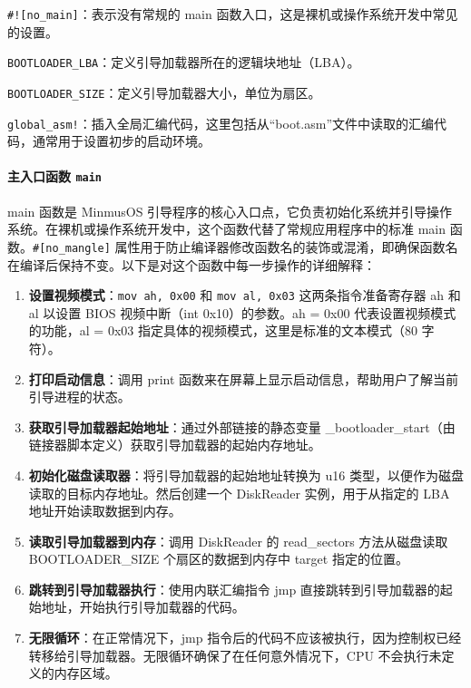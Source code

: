 \texttt{\#![no\_main]}：表示没有常规的 main 函数入口，这是裸机或操作系统开发中常见的设置。

\texttt{BOOTLOADER\_LBA}：定义引导加载器所在的逻辑块地址（LBA）。

\texttt{BOOTLOADER\_SIZE}：定义引导加载器大小，单位为扇区。

\texttt{global\_asm!}：插入全局汇编代码，这里包括从“boot.asm”文件中读取的汇编代码，通常用于设置初步的启动环境。

\paragraph{主入口函数 \texttt{main}}

main 函数是 MinmusOS 引导程序的核心入口点，它负责初始化系统并引导操作系统。在裸机或操作系统开发中，这个函数代替了常规应用程序中的标准 main 函数。\texttt{\#[no\_mangle]} 属性用于防止编译器修改函数名的装饰或混淆，即确保函数名在编译后保持不变。以下是对这个函数中每一步操作的详细解释：

\begin{enumerate}
    \item \textbf{设置视频模式}：\texttt{mov ah, 0x00} 和 \texttt{mov al, 0x03} 这两条指令准备寄存器 ah 和 al 以设置 BIOS 视频中断（int 0x10）的参数。ah = 0x00 代表设置视频模式的功能，al = 0x03 指定具体的视频模式，这里是标准的文本模式（80  字符）。
    \item \textbf{打印启动信息}：调用 print 函数来在屏幕上显示启动信息，帮助用户了解当前引导进程的状态。
    \item \textbf{获取引导加载器起始地址}：通过外部链接的静态变量 \_bootloader\_start（由链接器脚本定义）获取引导加载器的起始内存地址。
    \item \textbf{初始化磁盘读取器}：将引导加载器的起始地址转换为 u16 类型，以便作为磁盘读取的目标内存地址。然后创建一个 DiskReader 实例，用于从指定的 LBA 地址开始读取数据到内存。
    \item \textbf{读取引导加载器到内存}：调用 DiskReader 的 read\_sectors 方法从磁盘读取 BOOTLOADER\_SIZE 个扇区的数据到内存中 target 指定的位置。
    \item \textbf{跳转到引导加载器执行}：使用内联汇编指令 jmp 直接跳转到引导加载器的起始地址，开始执行引导加载器的代码。
    \item \textbf{无限循环}：在正常情况下，jmp 指令后的代码不应该被执行，因为控制权已经转移给引导加载器。无限循环确保了在任何意外情况下，CPU 不会执行未定义的内存区域。
\end{enumerate}

